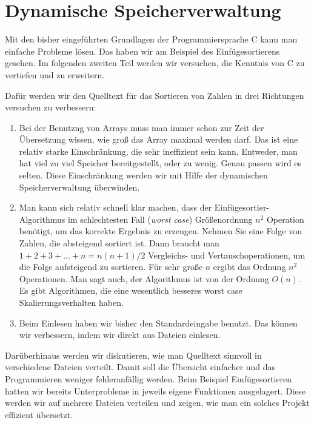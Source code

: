 \section{Dynamische Speicherverwaltung}

Mit den bisher eingeführten Grundlagen der Programmiersprache C kann man einfache Probleme lösen.
Das haben wir am Beispiel des Einfügesortierens gesehen.
Im folgenden zweiten Teil werden wir versuchen, die Kenntnis von C zu vertiefen und zu erweitern.

Dafür werden wir den Quelltext für das Sortieren von Zahlen in drei Richtungen versuchen zu verbessern:
\begin{enumerate}
\item Bei der Benutzng von Arrays muss man immer schon zur Zeit der Übersetzung wissen, wie groß das Array maximal werden darf.
  Das ist eine relativ starke Einschränkung, die sehr ineffizient sein kann.
  Entweder, man hat viel zu viel Speicher bereitgestellt, oder zu wenig.
  Genau passen wird es selten.
  Diese Einschränkung werden wir mit Hilfe der dynamischen Speicherverwaltung überwinden.

\item Man kann sich relativ schnell klar machen, dass der Einfügesortier-Algorithmus im schlechtesten Fall (\emph{worst case}) Größenordnung $n^2$ Operation benötigt, um das korrekte Ergebnis zu erzeugen.
  Nehmen Sie eine Folge von Zahlen, die absteigend sortiert ist.
  Dann braucht man $1 + 2 + 3 + ... + n = n(n+1)/2$ Vergleichs- und Vertauschoperationen, um die Folge aufsteigend zu sortieren.
  Für sehr große $n$ ergibt das Ordnung $n^2$ Operationen.
  Man sagt auch, der Algorithmus ist von der Ordnung $O(n)$.
  Es gibt Algorithmen, die eine wesentlich besseres worst case Skalierungsverhalten haben. 

\item Beim Einlesen haben wir bisher den Standardeingabe benutzt.
  Das können wir verbessern, indem wir direkt aus Dateien einlesen.
\end{enumerate}
Darüberhinaus werden wir diskutieren, wie man Quelltext sinnvoll in verschiedene Dateien verteilt.
Damit soll die Übersicht einfacher und das Programmieren weniger fehleranfällig werden.
Beim Beispiel Einfügesortieren hatten wir bereits Unterprobleme in jeweils eigene Funktionen ausgelagert.
Diese werden wir auf mehrere Dateien verteilen und zeigen, wie man ein solches Projekt effizient übersetzt.

